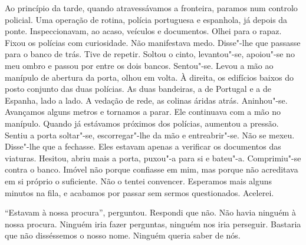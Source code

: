 Ao princípio da tarde, quando atravessávamos a fronteira, paramos num
controlo policial. Uma operação de rotina, polícia portuguesa e
espanhola, já depois da ponte. Inspeccionavam, ao acaso, veículos e
documentos. Olhei para o rapaz. Fixou os polícias com curiosidade. Não
manifestava medo. Disse"-lhe que passasse para o banco de trás. Tive de
repetir. Soltou o cinto, levantou"-se, apoiou"-se no meu ombro e passou
por entre os dois bancos. Sentou"-se. Levou a mão ao manípulo de
abertura da porta, olhou em volta. À direita, os edifícios baixos do
posto conjunto das duas polícias. As duas bandeiras, a de Portugal e a
de Espanha, lado a lado. A vedação de rede, as colinas áridas atrás.
Aninhou"-se. Avançamos alguns metros e tornamos a parar. Ele continuava
com a mão no manípulo. Quando já estávamos próximos dos polícias,
aumentou a pressão. Sentiu a porta soltar"-se, escorregar"-lhe da mão e
entreabrir"-se. Não se mexeu. Disse"-lhe que a fechasse. Eles estavam
apenas a verificar os documentos das viaturas. Hesitou, abriu mais a
porta, puxou"-a para si e bateu"-a. Comprimiu"-se contra o banco. Imóvel
não porque confiasse em mim, mas porque não acreditava em si próprio o
suficiente. Não o tentei convencer. Esperamos mais alguns minutos na
fila, e acabamos por passar sem sermos questionados. Acelerei.

``Estavam à nossa procura'',
perguntou. Respondi que não. Não havia ninguém à nossa procura. Ninguém
iria fazer perguntas, ninguém nos iria perseguir. Bastaria que não
disséssemos o nosso nome. Ninguém queria saber de nós.

